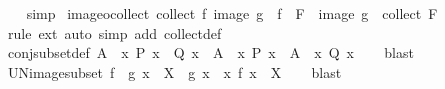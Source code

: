\begin{isabellebody}
%
\isadelimproof
\ \ %
\endisadelimproof
%
\isatagproof
{}\isamarkupfalse%
\ simp%
\endisatagproof
{\isafoldproof}%
%
\isadelimproof
\isanewline
%
\endisadelimproof
\isanewline
{}\isamarkupfalse%
\ image{\isacharunderscore}{\kern0pt}o{\isacharunderscore}{\kern0pt}collect{\isacharcolon}{\kern0pt}\ {\isachardoublequoteopen}collect\ {\isacharparenleft}{\kern0pt}{\isacharparenleft}{\kern0pt}{\isasymlambda}f{\isachardot}{\kern0pt}\ image\ g\ {\isasymcirc}\ f{\isacharparenright}{\kern0pt}\ {\isacharbackquote}{\kern0pt}\ F{\isacharparenright}{\kern0pt}\ {\isacharequal}{\kern0pt}\ image\ g\ {\isasymcirc}\ collect\ F{\isachardoublequoteclose}\isanewline
%
\isadelimproof
\ \ %
\endisadelimproof
%
\isatagproof
{}\isamarkupfalse%
\ {\isacharparenleft}{\kern0pt}rule\ ext{\isacharparenright}{\kern0pt}\ {\isacharparenleft}{\kern0pt}auto\ simp\ add{\isacharcolon}{\kern0pt}\ collect{\isacharunderscore}{\kern0pt}def{\isacharparenright}{\kern0pt}%
\endisatagproof
{\isafoldproof}%
%
\isadelimproof
\isanewline
%
\endisadelimproof
\isanewline
{}\isamarkupfalse%
\ conj{\isacharunderscore}{\kern0pt}subset{\isacharunderscore}{\kern0pt}def{\isacharcolon}{\kern0pt}\ {\isachardoublequoteopen}A\ {\isasymsubseteq}\ {\isacharbraceleft}{\kern0pt}x{\isachardot}{\kern0pt}\ P\ x\ {\isasymand}\ Q\ x{\isacharbraceright}{\kern0pt}\ {\isacharequal}{\kern0pt}\ {\isacharparenleft}{\kern0pt}A\ {\isasymsubseteq}\ {\isacharbraceleft}{\kern0pt}x{\isachardot}{\kern0pt}\ P\ x{\isacharbraceright}{\kern0pt}\ {\isasymand}\ A\ {\isasymsubseteq}\ {\isacharbraceleft}{\kern0pt}x{\isachardot}{\kern0pt}\ Q\ x{\isacharbraceright}{\kern0pt}{\isacharparenright}{\kern0pt}{\isachardoublequoteclose}\isanewline
%
\isadelimproof
\ \ %
\endisadelimproof
%
\isatagproof
{}\isamarkupfalse%
\ blast%
\endisatagproof
{\isafoldproof}%
%
\isadelimproof
\isanewline
%
\endisadelimproof
\isanewline
{}\isamarkupfalse%
\ UN{\isacharunderscore}{\kern0pt}image{\isacharunderscore}{\kern0pt}subset{\isacharcolon}{\kern0pt}\ {\isachardoublequoteopen}{\isasymUnion}{\isacharparenleft}{\kern0pt}f\ {\isacharbackquote}{\kern0pt}\ g\ x{\isacharparenright}{\kern0pt}\ {\isasymsubseteq}\ X\ {\isacharequal}{\kern0pt}\ {\isacharparenleft}{\kern0pt}g\ x\ {\isasymsubseteq}\ {\isacharbraceleft}{\kern0pt}x{\isachardot}{\kern0pt}\ f\ x\ {\isasymsubseteq}\ X{\isacharbraceright}{\kern0pt}{\isacharparenright}{\kern0pt}{\isachardoublequoteclose}\isanewline
%
\isadelimproof
\ \ %
\endisadelimproof
%
\isatagproof
{}\isamarkupfalse%
\ blast%
\endisatagproof
{\isafoldproof}%

\end{isabellebody}
